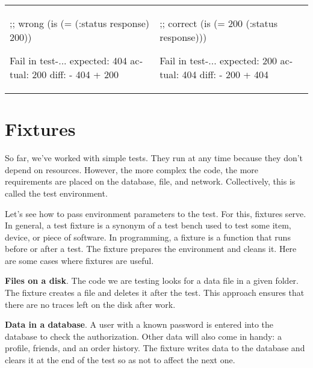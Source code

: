 \else

\begin{english}

\noindent
\begin{tabular}{ @{}p{5cm} @{}p{5cm} }

  \begin{clojure}
;; wrong
(is (= (:status response)
       200))

Fail in test-...
expected: 404
  actual: 200
    diff: - 404
          + 200
  \end{clojure}

&

  \begin{clojure}
;; correct
(is (= 200
       (:status response)))

Fail in test-...
expected: 200
  actual: 404
    diff: - 200
          + 404
  \end{clojure}

\end{tabular}

\end{english}

\fi

\section{Fixtures}


So far, we've worked with simple tests. They run at any time because they don't depend on resources. However, the more complex the code, the more requirements are placed on the database, file, and network. Collectively, this is called the test environment.

Let's see how to pass environment parameters to the test. For this, fixtures serve. In general, a test fixture is a synonym of a test bench used to test some item, device, or piece of software.  In programming, a fixture is a function that runs before or after a test. The fixture prepares the environment and cleans it. Here are some cases where fixtures are useful.


\textbf{Files on a disk}. The code we are testing looks for a data file in a given folder. The fixture creates a file and deletes it after the test. This approach ensures that there are no traces left on the disk after work.

\textbf{Data in a database}. A user with a known password is entered into the database to check the authorization. Other data will also come in handy: a profile, friends, and an order history. The fixture writes data to the database and clears it at the end of the test so as not to affect the next one.


